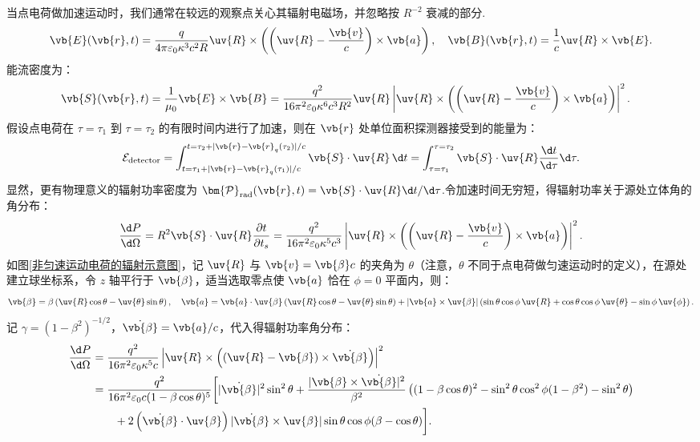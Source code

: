 当点电荷做加速运动时，我们通常在较远的观察点关心其辐射电磁场，并忽略按 \(R^{-2}\) 衰减的部分.
\begin{equation*}
	\vb{E}(\vb{r}, t) = \dfrac{q}{4\pi \varepsilon_0 \kappa^3 c^2 R} \uv{R} \times \left( \left( \uv{R} - \dfrac{\vb{v}}{c} \right) \times \vb{a} \right),\quad
	\vb{B}(\vb{r}, t) = \dfrac{1}{c} \uv{R} \times \vb{E}.
\end{equation*}
能流密度为：
\begin{align*}
	\vb{S}(\vb{r}, t) &= \dfrac{1}{\mu_0} \vb{E} \times \vb{B} = \dfrac{q^2}{16\pi^2 \varepsilon_0 \kappa^6 c^3 R^2} \uv{R} \left| \uv{R} \times \left( \left( \uv{R} - \dfrac{\vb{v}}{c} \right) \times \vb{a} \right) \right|^2.
\end{align*}
假设点电荷在 \(\tau = \tau_1\) 到 \(\tau = \tau_2\) 的有限时间内进行了加速，则在 \(\vb{r}\) 处单位面积探测器接受到的能量为：
\begin{equation*}
	\mathcal{E}_{\text{detector}} = \int_{t = \tau_1 + |\vb{r} - \vb{r}_q(\tau_1)|/c}^{t = \tau_2 + |\vb{r} - \vb{r}_q(\tau_2)|/c} \vb{S} \cdot \uv{R} \, \d t = \int_{\tau = \tau_1}^{\tau = \tau_2} \vb{S} \cdot \uv{R} \dfrac{\d t}{\d \tau} \d \tau.
\end{equation*}
显然，更有物理意义的辐射功率密度为 \(\bm{\mathcal{P}}_{\text{rad}}(\vb{r}, t) = \vb{S} \cdot \uv{R} \d t/\d \tau\).令加速时间无穷短，得辐射功率关于源处立体角的角分布：
\begin{equation*}
	\dfrac{\d P}{\d \Omega} = R^2 \vb{S} \cdot \uv{R} \dfrac{\partial t}{\partial t_s} = \dfrac{q^2}{16\pi^2 \varepsilon_0 \kappa^5 c^3} \left| \uv{R} \times \left( \left( \uv{R} - \dfrac{\vb{v}}{c} \right) \times \vb{a} \right) \right|^2.
\end{equation*}
如图\ref{非匀速运动电荷的辐射示意图}，记 \(\uv{R}\) 与 \(\vb{v} = \vb{\beta} c\) 的夹角为 \(\theta\)（注意，\(\theta\) 不同于点电荷做匀速运动时的定义），在源处建立球坐标系，令 \(z\) 轴平行于 \(\vb{\beta}\)，适当选取零点使 \(\vb{a}\) 恰在 \(\phi = 0\) 平面内，则：
\begin{equation*}
	\vb{\beta} = \beta \left( \uv{R} \cos\theta - \uv{\theta} \sin\theta \right),\quad
	\vb{a} = \vb{a} \cdot \uv{\beta} \left( \uv{R} \cos\theta - \uv{\theta} \sin\theta \right) + |\vb{a} \times \uv{\beta}| \left( \sin\theta \cos\phi\, \uv{R} + \cos\theta \cos\phi \,\uv{\theta} - \sin\phi\, \uv{\phi} \right).
\end{equation*}
记 \(\gamma = (1 - \beta^2)^{-1/2}\)，\(\dot{\vb{\beta}} = \vb{a}/c\)，代入得辐射功率角分布：
\begin{align*}
	\dfrac{\d P}{\d \Omega} &= \dfrac{q^2}{16\pi^2 \varepsilon_0 \kappa^5 c} \left| \uv{R} \times \left( \left( \uv{R} - \vb{\beta} \right) \times \dot{\vb{\beta}} \right) \right|^2 \\
	&= \dfrac{q^2}{16\pi^2 \varepsilon_0 c (1 - \beta \cos\theta)^5} \bigg[ |\dot{\vb{\beta}}|^2 \sin^2\theta + \dfrac{|\vb{\beta} \times \dot{\vb{\beta}}|^2}{\beta^2} \left( (1 - \beta \cos\theta)^2 - \sin^2\theta \cos^2\phi (1 - \beta^2) - \sin^2\theta \right) \\
		&\qquad + 2 \left( \dot{\vb{\beta}} \cdot \uv{\beta} \right) |\dot{\vb{\beta}} \times \uv{\beta}| \sin\theta \cos\phi (\beta - \cos\theta) \bigg].
\end{align*}
